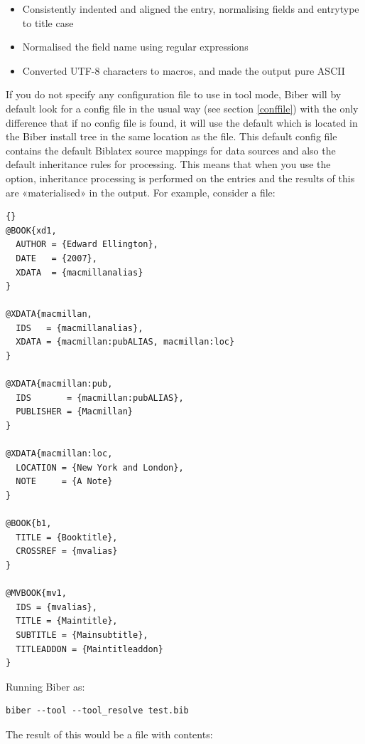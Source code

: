 \documentclass{ltxdockit}
\newcommand*{\biber}{Biber\xspace}
\newcommand*{\biblatex}{Biblatex\xspace}
\begin{document}
\begin{itemize}
\item Consistently indented and aligned the entry, normalising fields and
  entrytype to title case
\item Normalised the  field name using regular expressions
\item Converted UTF-8 characters to \latex macros, and made the output
  pure ASCII
\end{itemize}

If you do not specify any configuration file to use in tool mode, \biber
will by default look for a config file in the usual way (see section
\ref{conffile}) with the only difference that if no config file is found,
it will use the default  which is located in the
\biber install tree in the same location as the  file. This
default config file contains the default \biblatex source mappings for
\bibtex data sources and also the default inheritance rules for
 processing. This means that when you use the
 option, inheritance processing is performed on the
entries and the results of this are «materialised» in the output. For
example, consider a  file:

\begin{lstlisting}[style=bibtex, columns=fixed]{}
@BOOK{xd1,
  AUTHOR = {Edward Ellington},
  DATE   = {2007},
  XDATA  = {macmillanalias}
}

@XDATA{macmillan,
  IDS   = {macmillanalias},
  XDATA = {macmillan:pubALIAS, macmillan:loc}
}

@XDATA{macmillan:pub,
  IDS       = {macmillan:pubALIAS},
  PUBLISHER = {Macmillan}
}

@XDATA{macmillan:loc,
  LOCATION = {New York and London},
  NOTE     = {A Note} 
}

@BOOK{b1,
  TITLE = {Booktitle},
  CROSSREF = {mvalias}
}

@MVBOOK{mv1,
  IDS = {mvalias},
  TITLE = {Maintitle},
  SUBTITLE = {Mainsubtitle},
  TITLEADDON = {Maintitleaddon}
}
\end{lstlisting}
%
Running \biber as:

\begin{verbatim}
biber --tool --tool_resolve test.bib
\end{verbatim}
%
The result of this would be a file  with contents:
\end{document}
